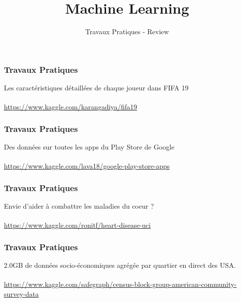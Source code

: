 \documentclass{formation}
\title{Machine Learning}
\subtitle{Travaux Pratiques - Review}
\begin{document}
\maketitle

\begin{frame}
  \frametitle{Travaux Pratiques}
  Les caractéristiques détaillées de chaque joueur dans FIFA 19 \\
  \\
  \url{https://www.kaggle.com/karangadiya/fifa19}
\end{frame}

\begin{frame}
  \frametitle{Travaux Pratiques}
  Des données sur toutes les apps du Play Store de Google \\
  \\
  \url{https://www.kaggle.com/lava18/google-play-store-apps}
\end{frame}

\begin{frame}
  \frametitle{Travaux Pratiques}
  Envie d'aider à combattre les maladies du coeur ? \\
  \\
  \url{https://www.kaggle.com/ronitf/heart-disease-uci}
\end{frame}

\begin{frame}
  \frametitle{Travaux Pratiques}
  2.0GB de données socio-économiques agrégée par quartier en direct des USA. \\
  \\
  \url{https://www.kaggle.com/safegraph/census-block-group-american-community-survey-data}
\end{frame}
\end{document}
